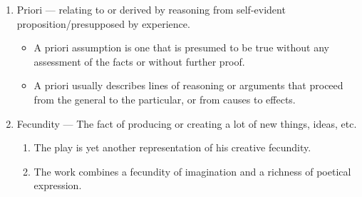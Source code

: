 \documentclass[oneside]{book}
\begin{document}
\begin{enumerate}
\begin{enumerate}
    \end{enumerate}
    \normalsize
    \item Priori --- relating to or derived by reasoning from self-evident proposition/presupposed by experience.
    \footnotesize
    \begin{itemize}
        \item A priori assumption is one that is presumed to be true without any assessment of the facts or without further proof.
        \item A priori usually describes lines of reasoning or arguments that proceed from the general to the particular, or from causes to effects.
    \end{itemize}
    \normalsize
    \item Fecundity --- The fact of producing or creating a lot of new things, ideas, etc. 
    \footnotesize
    \begin{enumerate}
        \item The play is yet another representation of his creative fecundity.
        \item The work combines a fecundity of imagination and a richness of poetical expression.
    \end{enumerate}
    \normalsize
\end{enumerate}
\end{document}

